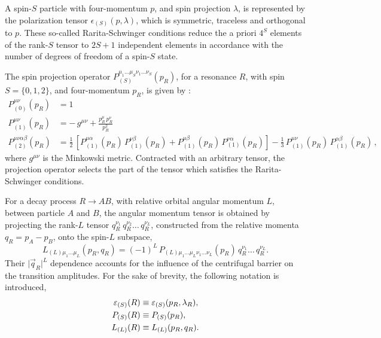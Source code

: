 A spin-$S$ particle with four-momentum $p$, and spin projection $\lambda$, is represented 
by the polarization tensor $\epsilon_{(S)}(p,\lambda)$, which is symmetric, traceless and orthogonal to $p$.
These so-called Rarita-Schwinger conditions reduce the a priori $4^{S}$  elements of the rank-$S$ tensor to 
$2S +1$ independent  elements in accordance with the number of degrees of freedom of a spin-$S$ state\cite{Rarita,Zhu}.

The spin projection operator $P^{\mu_{1} \dots \mu_{S} \nu_{1} \dots \nu_{S}}_{(S)}(p_{R})$,  
for a resonance $R$, with spin $S = \{0,1,2\}$, and four-momentum $p_{R}$,
is given by \cite{Filippini}:
\begin{align}
	\nonumber
	P_{(0)}^{\mu \nu}(p_{R}) &= 1 \\
	\nonumber
	P_{(1)}^{\mu \nu}(p_{R}) &= %
	- \, g^{\mu \nu} + \frac{p_{R}^{\mu} \, p_{R}^{\nu}}{p_{R}^{2}}    \\
	P_{(2)}^{\mu \nu \alpha \beta}(p_{R})  &=
	 \frac{1}{2} \,  \left[ P_{(1)}^{\mu \alpha}(p_{R})  \, P_{(1)}^{\nu \beta}(p_{R})  + P_{(1)}^{\mu \beta}(p_{R})  \, P_{(1)}^{\nu \alpha}(p_{R}) \right] - \frac{1}{3} \, P_{(1)}^{\mu \nu}(p_{R}) 
	 \, P_{(1)}^{\alpha \beta}(p_{R})    \,,
	\label{eq:pol1}
\end{align}
where $ g^{\mu \nu}$ %
is the Minkowski metric.
Contracted with an arbitrary tensor, the projection operator selects 
the part of the tensor which satisfies the Rarita-Schwinger conditions.

For a decay process $R \to A B$, with relative orbital angular momentum $L$, between particle $A$ and $B$,
the angular momentum tensor is obtained by 
projecting 
the rank-$L$ tensor $q_R^{\nu_{1}}   \,  q_R^{\nu_{2}}  \dots  \,  q_R^{\nu_{L}} $, constructed from the relative momenta
$q_{R} = p_{A} - p_{B}$,
onto the spin-$L$ subspace,
\begin{equation}
	L_{(L)\mu_{1}  \dots \mu_{L}}(p_{R},q_{R}) = (-1)^{L}  \, P_{(L)\mu_{1}  \dots \mu_{L} \nu_{1}  \dots \nu_{L}}(p_R)  \, 
	 q_R^{\nu_{1}}     \dots  \,  q_R^{\nu_{L}}  .
\end{equation}
Their $\vert \vec q_{R} \vert^{L} $ dependence accounts for the influence of the centrifugal barrier on the transition amplitudes.
For the sake of brevity, the following 
 notation is introduced,
\begin{align}
\nonumber
{\ensuremath{\varepsilon}}_{(S)}(R) & \equiv {\ensuremath{\varepsilon}}_{(S)}(p_{R},\lambda_{R}) , \\ \nonumber
P_{(S)}(R) & \equiv P_{(S)}(p_{R}), \\
L_{(L)}(R) & \equiv L_{(L)}(p_{R},q_{R})  .
\end{align}


